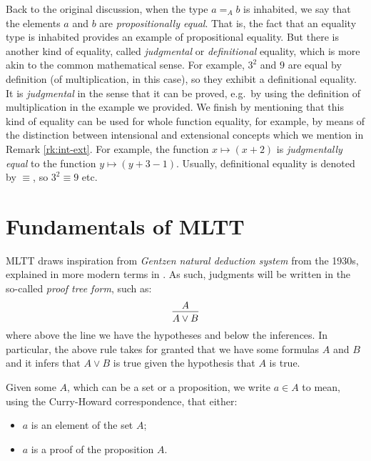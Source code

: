 Back to the original discussion, when the type $ a =_A b $ is inhabited,
we say that the elements $ a $ and $ b $ are \emph{propositionally equal}.
That is, the fact that an equality type is inhabited provides an example
of propositional equality. But there is another kind of equality, called
\emph{judgmental} or \emph{definitional} equality, which is more akin to the
common mathematical sense. For example, $ 3^2 $ and $ 9 $ are equal by definition
(of multiplication, in this case), so they exhibit a definitional equality.
It is \emph{judgmental} in the sense that it can be proved, e.g.\ by using
the definition of multiplication in the example we provided. We finish by
mentioning that this kind of equality can be used for whole function equality,
for example, by means of the distinction between intensional and extensional
concepts which we mention in Remark \ref{rk:int-ext}. For example,
the function $ x \mapsto (x + 2) $ is \emph{judgmentally equal} to
the function $ y \mapsto (y + 3 - 1) $. Usually, definitional equality is
denoted by $ \equiv $, so $ 3^2 \equiv 9 $ etc.


\section{Fundamentals of MLTT}
MLTT draws inspiration from \emph{Gentzen natural deduction system} from the 1930s,
explained in more modern terms in \cite{girard}. As such, judgments will be
written in the so-called \emph{proof tree form}, such as:
\[
  \begin{prooftree}
    \hypo{A}
    \infer1{A \lor B}
  \end{prooftree}
\]
where above the line we have the hypotheses and below the inferences.
In particular, the above rule takes for granted that we have some formulas
$ A $ and $ B $ and it infers that $ A \lor B $ is true given the hypothesis
that $ A $ is true.

Given some $ A $, which can be a set or a proposition, we write $ a \in A $
to mean, using the Curry-Howard correspondence, that either:
\begin{itemize}
\item $ a $ is an element of the set $ A $;
\item $ a $ is a proof of the proposition $ A $.
\end{itemize}

